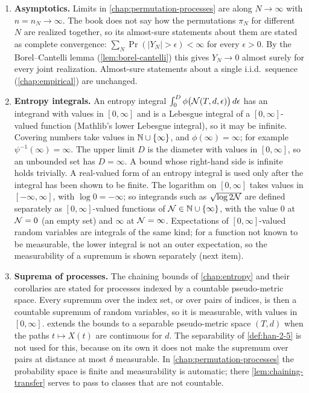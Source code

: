 \begin{enumerate}
  \item \textbf{Asymptotics.} Limits in \cref{chap:permutation-processes} are along $N\to\infty$ with $n=n_N\to\infty$. The book does not say how the permutations $\pi_N$ for different $N$ are realized together, so its almost-sure statements about them are stated as complete convergence: $\sum_N\Pr(|Y_N|>\epsilon)<\infty$ for every $\epsilon>0$. By the Borel--Cantelli lemma (\cref{lem:borel-cantelli}) this gives $Y_N\to0$ almost surely for every joint realization. Almost-sure statements about a single i.i.d.\ sequence (\cref{chap:empirical}) are unchanged.
  \item \textbf{Entropy integrals.} An entropy integral $\int_0^D\phi\bigl(\mathcal{N}(T,d,\epsilon)\bigr)\,d\epsilon$ has an integrand with values in $[0,\infty]$ and is a Lebesgue integral of a $[0,\infty]$-valued function (Mathlib's lower Lebesgue integral), so it may be infinite. Covering numbers take values in $\mathbb{N}\cup\{\infty\}$, and $\phi(\infty)=\infty$; for example $\psi^{-1}(\infty)=\infty$. The upper limit $D$ is the diameter with values in $[0,\infty]$, so an unbounded set has $D=\infty$. A bound whose right-hand side is infinite holds trivially. A real-valued form of an entropy integral is used only after the integral has been shown to be finite. The logarithm on $[0,\infty]$ takes values in $[-\infty,\infty]$, with $\log0=-\infty$; so integrands such as $\sqrt{\log2\mathcal{N}}$ are defined separately as $[0,\infty]$-valued functions of $\mathcal{N}\in\mathbb{N}\cup\{\infty\}$, with the value $0$ at $\mathcal{N}=0$ (an empty set) and $\infty$ at $\mathcal{N}=\infty$. Expectations of $[0,\infty]$-valued random variables are integrals of the same kind; for a function not known to be measurable, the lower integral is not an outer expectation, so the measurability of a supremum is shown separately (next item).
  \item \textbf{Suprema of processes.} The chaining bounds of \cref{chap:entropy} and their corollaries are stated for processes indexed by a countable pseudo-metric space. Every supremum over the index set, or over pairs of indices, is then a countable supremum of random variables, so it is measurable, with values in $[0,\infty]$.  extends the bounds to a separable pseudo-metric space $(T,d)$ when the paths $t\mapsto X(t)$ are continuous for $d$. The separability of \cref{def:han-2-5} is not used for this, because on its own it does not make the supremum over pairs at distance at most $\delta$ measurable. In \cref{chap:permutation-processes} the probability space is finite and measurability is automatic; there \cref{lem:chaining-transfer} serves to pass to classes that are not countable.

\end{enumerate}
